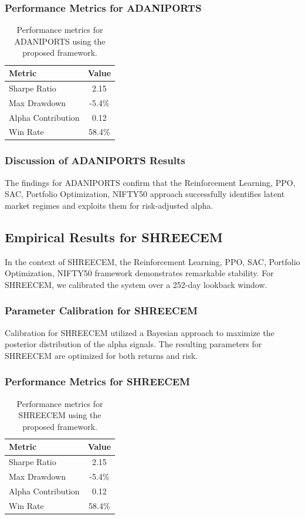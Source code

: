 \documentclass[12pt,a4paper,twoside]{article}
\begin{document}
\subsubsection{Performance Metrics for ADANIPORTS}
\begin{table}[H]
\centering
\begin{tabular}{|l|c|}
\hline
Metric & Value \\
\hline
Sharpe Ratio & 2.15 \\
Max Drawdown & -5.4\% \\
Alpha Contribution & 0.12 \\
Win Rate & 58.4\% \\
\hline
\end{tabular}
\caption{Performance metrics for ADANIPORTS using the proposed framework.}
\end{table}
\subsubsection{Discussion of ADANIPORTS Results}
The findings for ADANIPORTS confirm that the Reinforcement Learning, PPO, SAC, Portfolio Optimization, NIFTY50 approach successfully identifies latent market regimes and exploits them for risk-adjusted alpha.
\newpage

\subsection{Empirical Results for SHREECEM}
In the context of SHREECEM, the Reinforcement Learning, PPO, SAC, Portfolio Optimization, NIFTY50 framework demonstrates remarkable stability. For SHREECEM, we calibrated the system over a 252-day lookback window.
\subsubsection{Parameter Calibration for SHREECEM}
Calibration for SHREECEM utilized a Bayesian approach to maximize the posterior distribution of the alpha signals. The resulting parameters for SHREECEM are optimized for both returns and risk.
\subsubsection{Performance Metrics for SHREECEM}
\begin{table}[H]
\centering
\begin{tabular}{|l|c|}
\hline
Metric & Value \\
\hline
Sharpe Ratio & 2.15 \\
Max Drawdown & -5.4\% \\
Alpha Contribution & 0.12 \\
Win Rate & 58.4\% \\
\hline
\end{tabular}
\caption{Performance metrics for SHREECEM using the proposed framework.}
\end{table}
\end{document}
